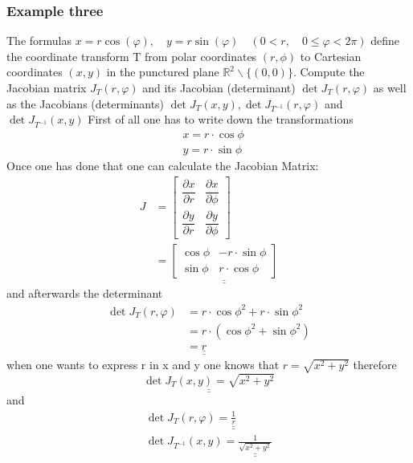 \subsubsection{Example three}
The formulas $x=r \cos (\varphi), \quad y=r \sin (\varphi) \quad(0<r, \quad 0 \leq \varphi<2 \pi)$ define the coordinate
transform T from polar coordinates $(r,\phi)$  to Cartesian coordinates $(x, y)$ in the punctured plane $\mathbb{R}^2 \backslash\{(0,0)\}$.\newline
Compute the Jacobian matrix $J_T(r, \varphi)$ and its Jacobian (determinant) $\operatorname{det} J_T(r, \varphi)$ as well
as the Jacobians (determinants) $\operatorname{det} J_T(x, y), \operatorname{det} J_{T^{-1}}(r, \varphi)$ and $\operatorname{det} J_{T^{-1}}(x, y)$ \newline\newline
First of all one has to write down the transformations
$$
\begin{aligned}
&x=r \cdot \cos{\phi} \\
&y=r \cdot \sin{\phi}
\end{aligned}
$$
Once one has done that one can calculate the Jacobian Matrix:
$$
\begin{aligned}
J&=\left[\begin{array}{cc}
\dfrac{\partial x}{\partial r} & \dfrac{\partial x}{\partial \phi} \\
\dfrac{\partial y}{\partial r} & \dfrac{\partial y}{\partial \phi}
\end{array}\right]\\&=\underline{\underline{\left[\begin{array}{cc}
\cos{\phi}&-r \cdot \sin{\phi}\\
\sin{\phi}& r \cdot \cos{\phi}
\end{array}\right]}}
\end{aligned}
$$
and afterwards the determinant
$$
\begin{aligned}
\operatorname{det} J_T(r, \varphi)&=r\cdot \cos{\phi}^2 + r\cdot \sin{\phi}^2
\\&=r \cdot \left( \cos{\phi}^2+\sin{\phi}^2\right)
\\&=\underline{\underline{r}}
\end{aligned}
$$
when one wants to express r in x and y one knows that $r = \sqrt{x^2+y^2}$ therefore 
$$
\underline{\underline{\operatorname{det} J_T(x, y)=\sqrt{x^2+y^2}}}
$$
and 
$$
\begin{aligned}
\operatorname{det} J_T(r, \varphi)=\underline{\underline{\frac{1}{r}}}\\
\operatorname{det} J_{T^{-1}}(x, y)=\underline{\underline{\frac{1}{\sqrt{x^2+y^2}}}}
\end{aligned}
$$
